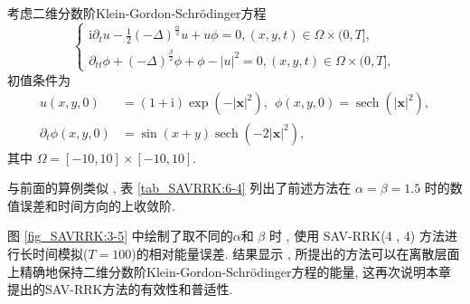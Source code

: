 \begin{example}\label{exp_SAVRRK:4}
考虑二维分数阶Klein-Gordon-Schr{\"o}dinger方程\cite{fuStructurepreservingAlgorithmsTwodimensional2020}
\begin{equation}
\begin{cases}
\mathrm{i} \partial_t u-\frac{1}{2}(-\Delta)^{\frac{\alpha}{2}} u+u \phi=0 , (x , y , t) \in \Omega \times(0 , T] , \\
\partial_{t t} \phi+(-\Delta)^{\frac{\beta}{2}} \phi+\phi-|u|^2=0 , (x , y , t) \in \Omega \times(0 , T] , 
\end{cases}
\end{equation}
初值条件为
\begin{equation}
	\begin{aligned}
		u(x , y , 0)&=(1+\mathrm{i}) \exp \left(-|\boldsymbol{x}|^2\right) , ~~\phi(x , y , 0)=\operatorname{sech}\left(|\boldsymbol{x}|^2\right) , \\
		\partial_t \phi(x , y , 0)&=\sin (x+y) \operatorname{sech}\left(-2|\boldsymbol{x}|^2\right) , 
	\end{aligned}
\end{equation}
其中 $\Omega=[-10 , 10] \times[-10 , 10]$.
\end{example}

与前面的算例类似 , 表 \ref{tab_SAVRRK:6-4} 列出了前述方法在 $\alpha=\beta=1.5$ 时的数值误差和时间方向的上收敛阶.

图 \ref{fig_SAVRRK:3-5} 中绘制了取不同的$\alpha$和 $\beta$ 时 , 使用 SAV-RRK(4 , 4) 方法进行长时间模拟($T=100$)的相对能量误差.
结果显示 , 所提出的方法可以在离散层面上精确地保持二维分数阶Klein-Gordon-Schr{\"o}dinger方程的能量, 这再次说明本章提出的SAV-RRK方法的有效性和普适性.

